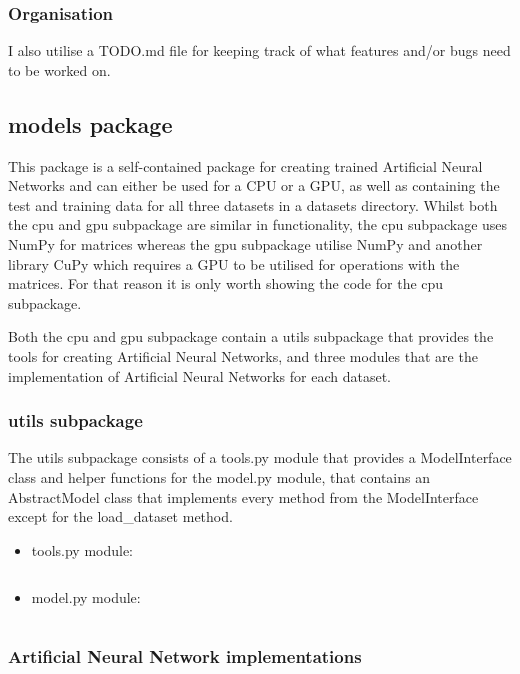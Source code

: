 \documentclass[./project-report/src/latex/project-report.tex]{subfiles}
\begin{document}
\subsubsection{Organisation}

I also utilise a TODO.md file for keeping track of what features and/or bugs need to be worked on.

\subsection{models package}

This package is a self-contained package for creating trained Artificial Neural Networks and can either be used for a CPU or a GPU, as well as containing the test 
and training data for all three datasets in a datasets directory. Whilst both the cpu and gpu subpackage are similar in functionality, the cpu subpackage uses NumPy 
for matrices whereas the gpu subpackage utilise NumPy and another library CuPy which requires a GPU to be utilised for operations with the matrices. For that reason 
it is only worth showing the code for the cpu subpackage.

Both the cpu and gpu subpackage contain a utils subpackage that provides the tools for creating Artificial Neural Networks, and three modules that are the implementation 
of Artificial Neural Networks for each dataset.

\subsubsection{utils subpackage}
\label{sec:utils-subpackage}

The utils subpackage consists of a tools.py module that provides a ModelInterface class and helper functions for the model.py module, that contains an AbstractModel 
class that implements every method from the ModelInterface except for the load\_dataset method.

\begin{itemize}
    \item tools.py module:
        \inputminted{python}{./school_project/models/cpu/utils/tools.py}
    \item model.py module:
        \label{sec:model-module}
        \inputminted{python}{./school_project/models/cpu/utils/model.py}
\end{itemize}

\subsubsection{Artificial Neural Network implementations}
\label{sec:ann-implementations}
\end{document}
